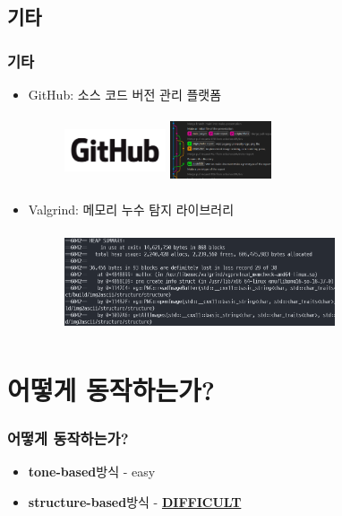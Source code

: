 \documentclass{beamer}
\newcommand{\spacing}{\hspace{0.3em}}
\newcommand{\tonebased}{\textbf{tone-based}}
\newcommand{\structurebased}{\textbf{structure-based}}
\begin{document}
	\subsection{기타}
	\begin{frame}{}
		\frametitle{기타}
		\begin{itemize}
			\item GitHub: 소스 코드 버전 관리 플랫폼
			\begin{figure}
				\includegraphics[width=3cm, height=2cm]{GitHub1.png}
				\hspace{1em}
				\includegraphics[width=3cm, height=2cm]{GitHub2.png}
			\end{figure}
			\item Valgrind: 메모리 누수 탐지 라이브러리
			\begin{figure}
				\includegraphics[width=8cm, height=3cm]{Valgrind.png}
			\end{figure}
		\end{itemize}
	\end{frame}

\section{어떻게 동작하는가?}
\begin{frame}{}
	\frametitle{어떻게 동작하는가?}
	\begin{itemize}
		\item \tonebased \spacing 방식 - easy
		\item \structurebased \spacing 방식 - \underline{\textbf{DIFFICULT}}
	\end{itemize}
\end{frame}
\end{document}

